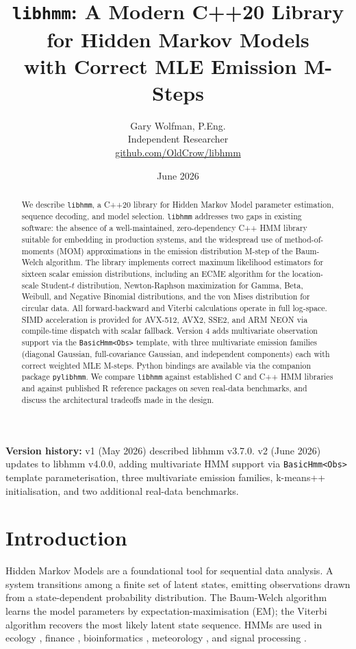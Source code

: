 \documentclass[11pt]{article}
\title{\texttt{libhmm}: A Modern C++20 Library for Hidden Markov Models\\
       with Correct MLE Emission M-Steps}
\author{Gary Wolfman, P.Eng.\\
        Independent Researcher\\
        \href{https://github.com/OldCrow/libhmm}{github.com/OldCrow/libhmm}}
\date{June 2026}
\begin{document}
\maketitle

{\small\noindent\textbf{Version history:} v1 (May 2026) described libhmm v3.7.0.
v2 (June 2026) updates to libhmm v4.0.0, adding multivariate HMM support via
\texttt{BasicHmm<Obs>} template parameterisation, three multivariate emission
families, k-means++ initialisation, and two additional real-data benchmarks.}

\begin{abstract}
We describe \texttt{libhmm}, a C++20 library for Hidden Markov Model
parameter estimation, sequence decoding, and model selection.
\texttt{libhmm} addresses two gaps in existing software:
the absence of a well-maintained, zero-dependency C++ HMM library
suitable for embedding in production systems, and the widespread use of
method-of-moments (MOM) approximations in the emission distribution
M-step of the Baum-Welch algorithm.
The library implements correct maximum likelihood estimators for sixteen
scalar emission distributions, including an ECME algorithm
for the location-scale Student-$t$ distribution, Newton-Raphson maximization
for Gamma, Beta, Weibull, and Negative Binomial distributions, and the
von Mises distribution for circular data.
All forward-backward and Viterbi calculations operate in full log-space.
SIMD acceleration is provided for AVX-512, AVX2, SSE2, and ARM NEON
via compile-time dispatch with scalar fallback.
Version 4 adds multivariate observation support via the
\texttt{BasicHmm<Obs>} template, with three multivariate emission families
(diagonal Gaussian, full-covariance Gaussian, and independent components)
each with correct weighted MLE M-steps.
Python bindings are available via the companion package
\texttt{pylibhmm}.
We compare \texttt{libhmm} against established C and C++ HMM libraries
and against published R reference packages on seven real-data benchmarks,
and discuss the architectural tradeoffs made in the design.
\end{abstract}

\section{Introduction}
\label{sec:intro}

Hidden Markov Models \citep{Baum1970, Rabiner1989} are a foundational tool
for sequential data analysis.
A system transitions among a finite set of latent states, emitting
observations drawn from a state-dependent probability distribution.
The Baum-Welch algorithm \citep{Baum1970, Dempster1977} learns the model
parameters by expectation-maximisation (EM); the Viterbi algorithm
\citep{Viterbi1967} recovers the most likely latent state sequence.
HMMs are used in ecology \citep{Michelot2016, Morales2004},
finance \citep{Oelschlager2024}, bioinformatics \citep{Durbin1998},
meteorology \citep{Zucchini2017}, and signal processing \citep{Rabiner1989}.
\end{document}

